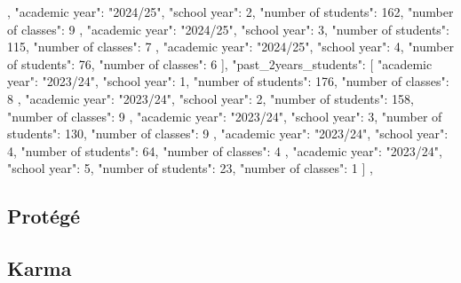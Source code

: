 {{{                },
                {
                    "academic year": "2024/25",
                    "school year": 2,
                    "number of students": 162,
                    "number of classes": 9
                },
                {
                    "academic year": "2024/25",
                    "school year": 3,
                    "number of students": 115,
                    "number of classes": 7
                },
                {
                    "academic year": "2024/25",
                    "school year": 4,
                    "number of students": 76,
                    "number of classes": 6
                }
            ],
            "past_2years_students": [
                {
                    "academic year": "2023/24",
                    "school year": 1,
                    "number of students": 176,
                    "number of classes": 8
                },
                {
                    "academic year": "2023/24",
                    "school year": 2,
                    "number of students": 158,
                    "number of classes": 9
                },
                {
                    "academic year": "2023/24",
                    "school year": 3,
                    "number of students": 130,
                    "number of classes": 9
                },
                {
                    "academic year": "2023/24",
                    "school year": 4,
                    "number of students": 64,
                    "number of classes": 4
                },
                {
                    "academic year": "2023/24",
                    "school year": 5,
                    "number of students": 23,
                    "number of classes": 1
                }
            ]
        }
    },

\subsection{Protégé}
\subsection{Karma}
